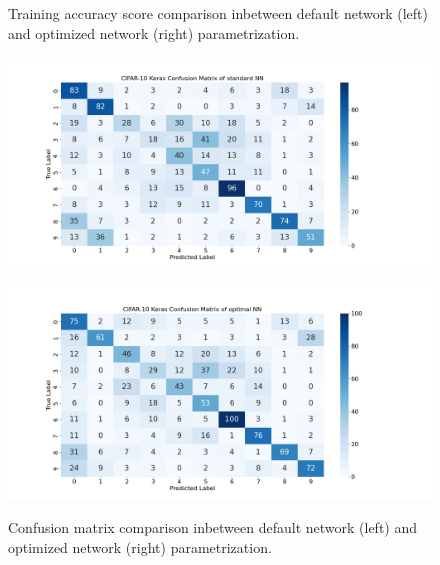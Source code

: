\begin{figure}[H]
\begin{minipage}{.5\textwidth}
    \label{fig:training_history_optimal}
  \end{minipage}
  \caption{Training accuracy score comparison inbetween default network (left) and optimized network (right) parametrization.}
  \label{fig:training_history_overview}
\end{figure}

\begin{figure}[H]
    \centering
    \begin{minipage}{.5\textwidth}
      \centering
      \includegraphics[width=1.25\linewidth]{img/ConfusionMatrix_standard.png}
      \label{fig:confusion_matrix_standard}
    \end{minipage}%
    \begin{minipage}{.5\textwidth}
      \centering
      \includegraphics[width=1.25\linewidth]{img/ConfusionMatrix_optimal.png}
      \label{fig:confusion_matrix_optimal}
    \end{minipage}
    \caption{Confusion matrix comparison inbetween default network (left) and optimized network (right) parametrization.}
    \label{fig:confusion_matrix_overview}
\end{figure}



